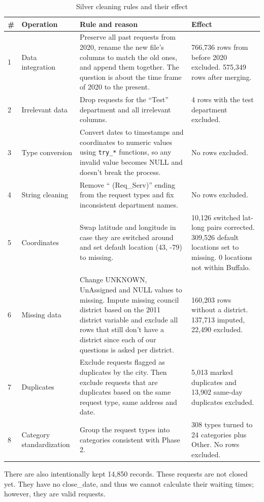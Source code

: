 \documentclass[conference]{IEEEtran}
\begin{document}
\begin{table}[t]
\centering
\caption{Silver cleaning rules and their effect}
\label{tab:rules}
\begin{tabular}{p{0.3cm}p{3.1cm}p{6.6cm}p{6.2cm}}
\toprule
\# & Operation & Rule and reason & Effect \\
\midrule
1 & Data integration & Preserve all past requests from 2020, rename the new file's columns to match the old ones, and append them together. The question is about the time frame of 2020 to the present. & 766,736 rows from before 2020 excluded. 575,349 rows after merging. \\
2 & Irrelevant data & Drop requests for the ``Test'' department and all irrelevant columns. & 4 rows with the test department excluded. \\
3 & Type conversion & Convert dates to timestamps and coordinates to numeric values using \texttt{try\_*} functions, so any invalid value becomes NULL and doesn't break the process. & No rows excluded. \\
4 & String cleaning & Remove `` (Req\_Serv)'' ending from the request types and fix inconsistent department names. & No rows excluded. \\
5 & Coordinates & Swap latitude and longitude in case they are switched around and set default location (43, -79) to missing. & 10,126 switched lat-long pairs corrected. 309,526 default locations set to missing. 0 locations not within Buffalo. \\
6 & Missing data & Change UNKNOWN, UnAssigned and NULL values to missing. Impute missing council district based on the 2011 district variable and exclude all rows that still don't have a district since each of our questions is asked per district. & 160,203 rows without a district. 137,713 imputed, 22,490 excluded. \\
7 & Duplicates & Exclude requests flagged as duplicates by the city. Then exclude requests that are duplicates based on the same request type, same address and date. & 5,013 marked duplicates and 13,902 same-day duplicates excluded. \\
8 & Category standardization & Group the request types into categories consistent with Phase 2. & 308 types turned to 24 categories plus Other. No rows excluded. \\
\bottomrule
\end{tabular}
\end{table}

There are also intentionally kept 14,850 records. These requests are not closed yet. They have no close\_date, and thus we cannot calculate their waiting times; however, they are valid requests.
\end{document}
